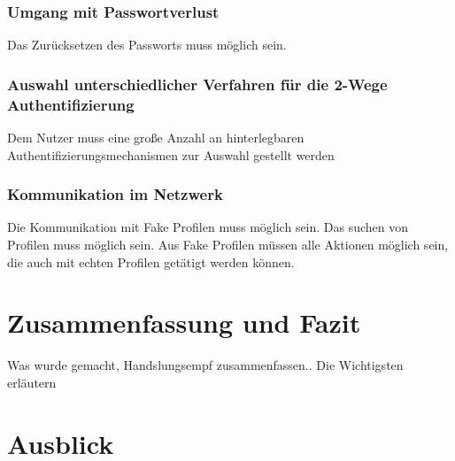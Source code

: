 \documentclass{sigchi}
\begin{document}
\subsubsection{Umgang mit Passwortverlust}
Das Zurücksetzen des Passworts muss möglich sein.
\subsubsection{Auswahl unterschiedlicher Verfahren für die 2-Wege Authentifizierung}
Dem Nutzer muss eine große Anzahl an hinterlegbaren Authentifizierungsmechanismen zur Auswahl gestellt werden
\subsubsection{Kommunikation im Netzwerk}
Die Kommunikation mit Fake Profilen muss möglich sein. Das suchen von Profilen muss möglich sein. Aus Fake Profilen müssen alle Aktionen möglich sein, die auch mit echten Profilen getätigt werden können.
\section{Zusammenfassung und Fazit}
Was wurde gemacht, Handslungsempf zusammenfassen..
Die Wichtigsten erläutern
\section{Ausblick}

%
%
\end{document}
